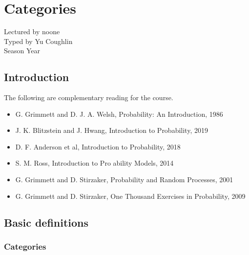 \documentclass[../Year2.tex]{subfiles}
\begin{document}
\chapter{Categories}
\renewcommand*\thesection{\arabic{section}}
Lectured by noone \\ Typed by Yu Coughlin \\
Season Year

\section*{Introduction}

The following are complementary reading for the course.
\begin{itemize}
    \item G. Grimmett and D. J. A. Welsh, Probability: An Introduction, 1986
    \item J. K. Blitzstein and J. Hwang, Introduction to Probability, 2019
    \item D. F. Anderson et al, Introduction to Probability, 2018
    \item S. M. Ross, Introduction to Pro ability Models, 2014
    \item G. Grimmett and D. Stirzaker, Probability and Random Processes, 2001
    \item G. Grimmett and D. Stirzaker, One Thousand Exercises in Probability, 2009
\end{itemize}

\tableofcontents\pagebreak

\section{Basic definitions}

\subsection{Categories}
\end{document}
